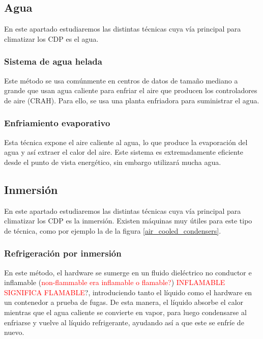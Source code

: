 \subsection{Agua}

En este apartado estudiaremos las distintas técnicas cuya vía principal para climatizar los CDP es el agua.

\subsubsection{Sistema de agua helada}

Este método se usa comúnmente en centros de datos de tamaño mediano a grande que usan agua caliente para enfriar el aire que producen los controladores de aire (CRAH). Para ello, se usa una planta enfriadora para suministrar el agua.

\subsubsection{Enfriamiento evaporativo}

Esta técnica expone el aire caliente al agua, lo que produce la evaporación del agua y así extraer el calor del aire. Este sistema es extremadamente eficiente desde el punto de vista energético, sin embargo utilizará mucha agua.

\subsection{Inmersión}

En este apartado estudiaremos las distintas técnicas cuya vía principal para climatizar los CDP es la inmersión. Existen máquinas muy útiles para este tipo de técnica, como por ejemplo la de la figura \ref{air_cooled_condensers}.

\subsubsection{Refrigeración por inmersión}

En este método, el hardware se sumerge en un fluido dieléctrico no conductor e inflamable (\textcolor{red}{non-flammable era inflamable o flamable?}) \textcolor{red}{INFLAMABLE SIGNIFICA FLAMABLE}?, introduciendo tanto el líquido como el hardware en un contenedor a prueba de fugas. De esta manera, el líquido absorbe el calor mientras que el agua caliente se convierte en vapor, para luego condensarse al enfriarse y vuelve al líquido refrigerante, ayudando así a que este se enfríe de nuevo.

